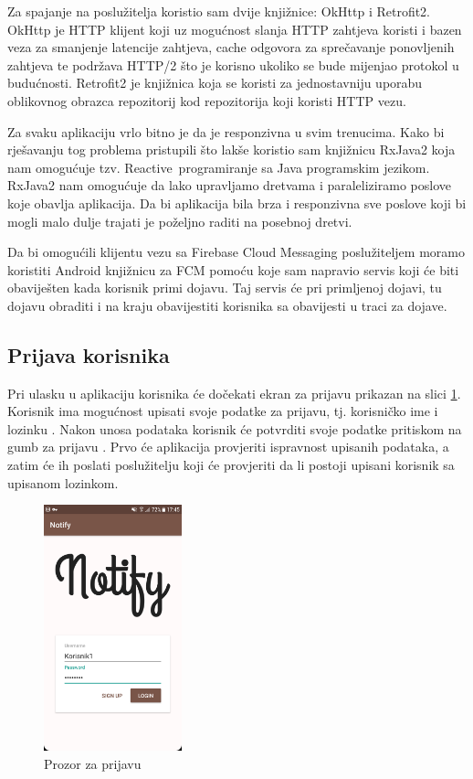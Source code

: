 \documentclass[times, utf8, zavrsni]{fer}
\begin{document}
Za spajanje na poslužitelja koristio sam dvije knjižnice: OkHttp i Retrofit2. OkHttp je HTTP klijent koji uz mogućnost slanja HTTP zahtjeva koristi i bazen veza za smanjenje latencije zahtjeva, cache odgovora za sprečavanje ponovljenih zahtjeva te podržava HTTP/2 što je korisno ukoliko se bude mijenjao protokol u budućnosti. Retrofit2 je knjižnica koja se koristi za jednostavniju uporabu oblikovnog obrazca repozitorij kod repozitorija koji koristi HTTP vezu.

Za svaku aplikaciju vrlo bitno je da je responzivna u svim trenucima. Kako bi rješavanju tog problema pristupili što lakše koristio sam knjižnicu RxJava2 koja nam omogućuje tzv. \glqq Reactive\grqq\  programiranje sa Java programskim jezikom. RxJava2 nam omogućuje da lako upravljamo dretvama i paraleliziramo poslove koje obavlja aplikacija. Da bi aplikacija bila brza i responzivna sve poslove koji bi mogli malo dulje trajati je poželjno raditi na posebnoj dretvi.

Da bi omogućili klijentu vezu sa Firebase Cloud Messaging poslužiteljem moramo koristiti Android knjižnicu za FCM pomoću koje sam napravio servis koji će biti obaviješten kada korisnik primi dojavu. Taj servis će pri primljenoj dojavi, tu dojavu obraditi i na kraju obavijestiti korisnika sa obavijesti u traci za dojave.

\subsection{Prijava korisnika}
Pri ulasku u aplikaciju korisnika će dočekati ekran za prijavu prikazan na slici \ref{fig:login-image}. Korisnik ima mogućnost upisati svoje podatke za prijavu, tj. korisničko ime  i lozinku . Nakon unosa podataka korisnik će potvrditi svoje podatke pritiskom na gumb za prijavu . Prvo će aplikacija provjeriti ispravnost upisanih podataka, a zatim će ih poslati poslužitelju koji će provjeriti da li postoji upisani korisnik sa upisanom lozinkom.

\begin{figure}[htb]
\centering
\includegraphics[width=4cm]{img/ss-login.png}
\caption{Prozor za prijavu}
\label{fig:login-image}
\end{figure}
\end{document}
